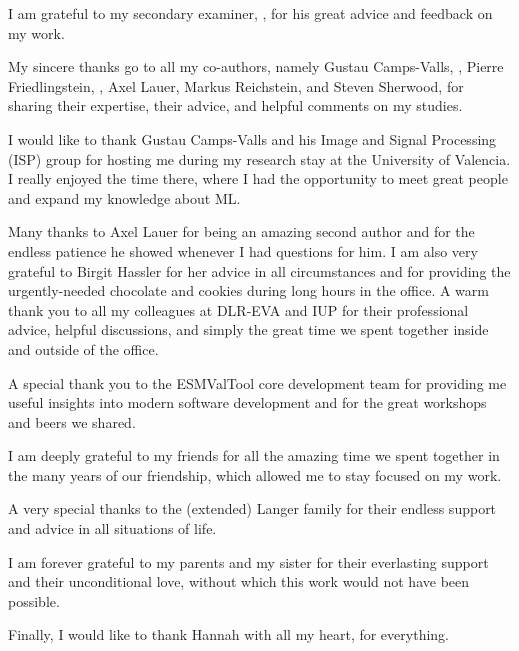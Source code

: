 I am grateful to my secondary examiner, \TheSecondaryExaminer{}, for his great
advice and feedback on my work.

My sincere thanks go to all my co-authors, namely \Prof{} \Dr{} Gustau
Camps-Valls, \ThePrimaryExaminer{}, \Prof{} \Dr{} Pierre Friedlingstein,
\TheSecondaryExaminer{}, \Dr{} Axel Lauer, \Prof{} \Dr{} Markus Reichstein, and
\Prof{} \Dr{} Steven Sherwood, for sharing their expertise, their advice, and
helpful comments on my studies.

I would like to thank \Prof{} \Dr{} Gustau Camps-Valls and his Image and Signal
Processing (ISP) group for hosting me during my research stay at the University
of Valencia. I really enjoyed the time there, where I had the opportunity to
meet great people and expand my knowledge about \acl{ML}.

Many thanks to \Dr{} Axel Lauer for being an amazing second author and for the
endless patience he showed whenever I had questions for him. I am also very
grateful to \Dr{} Birgit Hassler for her advice in all circumstances and for
providing the urgently-needed chocolate and cookies during long hours in the
office. A warm thank you to all my colleagues at DLR-EVA and IUP for their
professional advice, helpful discussions, and simply the great time we spent
together inside and outside of the office.

A special thank you to the \ac{ESMValTool} core development team for providing
me useful insights into modern software development and for the great workshops
and beers we shared.

I am deeply grateful to my friends for all the amazing time we spent together
in the many years of our friendship, which allowed me to stay focused on my
work.

A very special thanks to the (extended) Langer family for their endless support
and advice in all situations of life.

I am forever grateful to my parents and my sister for their everlasting support
and their unconditional love, without which this work would not have been
possible.

Finally, I would like to thank Hannah with all my heart, for everything.
